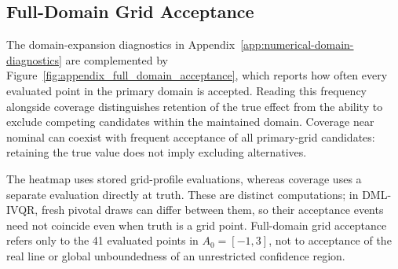 
\FloatBarrier

\subsection{Full-Domain Grid Acceptance}

The domain-expansion diagnostics in Appendix~\ref{app:numerical-domain-diagnostics} are complemented by Figure~\ref{fig:appendix_full_domain_acceptance}, which reports how often every evaluated point in the primary domain is accepted. Reading this frequency alongside coverage distinguishes retention of the true effect from the ability to exclude competing candidates within the maintained domain. Coverage near nominal can coexist with frequent acceptance of all primary-grid candidates: retaining the true value does not imply excluding alternatives.

The heatmap uses stored grid-profile evaluations, whereas coverage uses a separate evaluation directly at truth. These are distinct computations; in DML-IVQR, fresh pivotal draws can differ between them, so their acceptance events need not coincide even when truth is a grid point. Full-domain grid acceptance refers only to the 41 evaluated points in $A_0=[-1,3]$, not to acceptance of the real line or global unboundedness of an unrestricted confidence region.


\FloatBarrier
